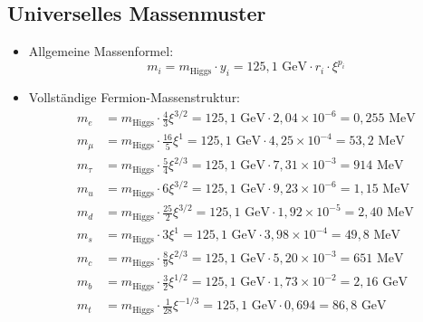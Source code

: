 \documentclass[12pt,a4paper]{article}
\begin{document}
\subsection{Universelles Massenmuster}
\begin{itemize}
	\item Allgemeine Massenformel:
	\begin{equation}
		m_i = m_{\text{Higgs}} \cdot y_i = 125,1 \text{ GeV} \cdot r_i \cdot \xi^{p_i}
	\end{equation}
	
	\item Vollständige Fermion-Massenstruktur:
	\begin{align}
		m_e &= m_{\text{Higgs}} \cdot \frac{4}{3}\xi^{3/2} = 125,1 \text{ GeV} \cdot 2,04 \times 10^{-6} = 0,255 \text{ MeV}\\
		m_\mu &= m_{\text{Higgs}} \cdot \frac{16}{5}\xi^1 = 125,1 \text{ GeV} \cdot 4,25 \times 10^{-4} = 53,2 \text{ MeV}\\
		m_\tau &= m_{\text{Higgs}} \cdot \frac{5}{4}\xi^{2/3} = 125,1 \text{ GeV} \cdot 7,31 \times 10^{-3} = 914 \text{ MeV}\\
		m_u &= m_{\text{Higgs}} \cdot 6\xi^{3/2} = 125,1 \text{ GeV} \cdot 9,23 \times 10^{-6} = 1,15 \text{ MeV}\\
		m_d &= m_{\text{Higgs}} \cdot \frac{25}{2}\xi^{3/2} = 125,1 \text{ GeV} \cdot 1,92 \times 10^{-5} = 2,40 \text{ MeV}\\
		m_s &= m_{\text{Higgs}} \cdot 3\xi^1 = 125,1 \text{ GeV} \cdot 3,98 \times 10^{-4} = 49,8 \text{ MeV}\\
		m_c &= m_{\text{Higgs}} \cdot \frac{8}{9}\xi^{2/3} = 125,1 \text{ GeV} \cdot 5,20 \times 10^{-3} = 651 \text{ MeV}\\
		m_b &= m_{\text{Higgs}} \cdot \frac{3}{2}\xi^{1/2} = 125,1 \text{ GeV} \cdot 1,73 \times 10^{-2} = 2,16 \text{ GeV}\\
		m_t &= m_{\text{Higgs}} \cdot \frac{1}{28}\xi^{-1/3} = 125,1 \text{ GeV} \cdot 0,694 = 86,8 \text{ GeV}
	\end{align}
\end{itemize}
\end{document}

